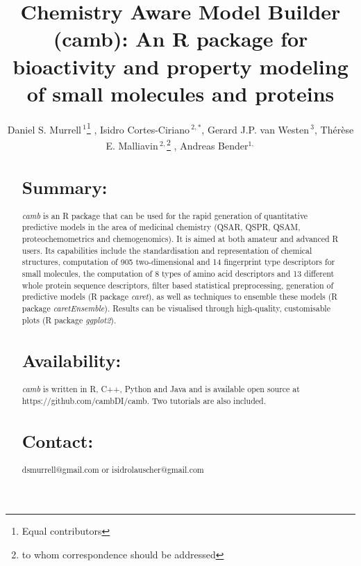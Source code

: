 \documentclass{bioinfo}
\begin{document}

\title{Chemistry Aware Model Builder (camb): An R package for bioactivity and property modeling of small molecules and proteins}
\author[Murrell \& Cortes-Ciriano \it{et~al}]{Daniel S. Murrell\,$^{1}$\footnote{Equal contributors} , Isidro Cortes-Ciriano\,$^{2,*}$, Gerard J.P. van Westen\,$^{3}$, Th\'er\`ese E. Malliavin\,$^{2,}$\footnote{to whom correspondence should be addressed} , Andreas Bender$^{1,}$\dag}
\address{$^{1}$Unilever Centre for Molecular Science Informatics, Department of Chemistry, University of Cambridge, Cambridge, United Kingdom.\\
$^{2}$Unite de Bioinformatique Structurale, Institut Pasteur and CNRS UMR 3825, Structural Biology and Chemistry Department, 25, rue Dr. Roux, 75 724 Paris, France.\\
$^{3}$European Molecular Biology Laboratory European Bioinformatics Institute Wellcome Trust Genome Campus, Hinxton, United Kingdom.}

\maketitle

\begin{abstract}
\section{Summary:}
{\it camb} is an R package that can be used for the rapid generation of quantitative predictive models in the area of medicinal chemistry (QSAR, QSPR, QSAM, proteochemometrics and chemogenomics). It is aimed at both amateur and advanced R users.
Its capabilities include the standardisation and representation of chemical structures, computation of 905 two-dimensional and 14 fingerprint type descriptors for small molecules, the computation of 8 types of amino acid descriptors and 13 different whole protein sequence descriptors, filter based statistical preprocessing, generation of predictive models (R package {\it caret}), as well as techniques to ensemble these models (R package {\it caretEnsemble}).
Results can be visualised through high-quality, customisable plots (R package {\it ggplot2}).
\section{Availability:} {\it camb} is written in R, C++, Python and Java and is available open source
at https://github.com/cambDI/camb.
Two tutorials are also included.\\
\section{Contact:} dsmurrell@gmail.com or isidrolauscher@gmail.com
\end{abstract}
\end{document}
